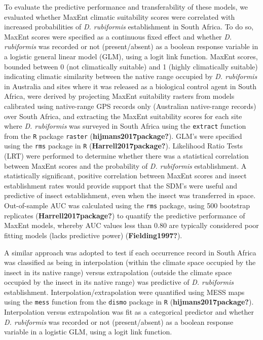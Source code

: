 \documentclass[12pt,]{article}
\begin{document}
To evaluate the predictive performance and transferability of these
models, we evaluated whether MaxEnt climatic suitability scores were
correlated with increased probabilities of \emph{D. rubiformis}
establishment in South Africa. To do so, MaxEnt scores were specified as
a continuous fixed effect and whether \emph{D. rubiformis} was recorded
or not (present/absent) as a boolean response variable in a logistic
general linear model (GLM), using a logit link function. MaxEnt scores,
bounded between 0 (not climatically suitable) and 1 (highly climatically
suitable) indicating climatic similarity between the native range
occupied by \emph{D. rubiformis} in Australia and sites where it was
released as a biological control agent in South Africa, were derived by
projecting MaxEnt suitability rasters from models calibrated using
native-range GPS records only (Australian native-range records) over
South Africa, and extracting the MaxEnt suitability scores for each site
where \emph{D. rubiformis} was surveyed in South Africa using the
\texttt{extract} function from the \texttt{R} package \texttt{raster}
(\textbf{hijmans2017package?}). GLM's were specified using the
\texttt{rms} package in \texttt{R} (\textbf{Harrell2017package?}).
Likelihood Ratio Tests (LRT) were performed to determine whether there
was a statistical correlation between MaxEnt scores and the probability
of \emph{D. rubiformis} establishment. A statistically significant,
positive correlation between MaxEnt scores and insect establishment
rates would provide support that the SDM's were useful and predictive of
insect establishment, even when the insect was transferred in space.
Out-of-sample AUC was calculated using the \texttt{rms} package, using
500 bootstrap replicates (\textbf{Harrell2017package?}) to quantify the
predictive performance of MaxEnt models, whereby AUC values less than
0.80 are typically considered poor fitting models (lacks predictive
power) (\textbf{Fielding1997?}).

A similar approach was adopted to test if each occurrence record in
South Africa was classified as being in interpolation (within the
climate space occupied by the insect in its native range) versus
extrapolation (outside the climate space occupied by the insect in its
native range) was predictive of \emph{D. rubiformis} establishment.
Interpolation/extrapolation were quantified using MESS maps using the
\texttt{mess} function from the \texttt{dismo} package in \texttt{R}
(\textbf{hijmans2017package?}). Interpolation versus extrapolation was
fit as a categorical predictor and whether \emph{D. rubiformis} was
recorded or not (present/absent) as a boolean response variable in a
logistic GLM, using a logit link function.
\end{document}
